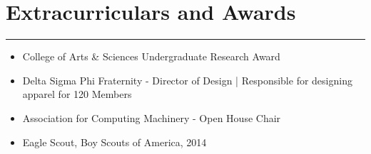 \documentclass[11pt]{article}
\newcommand{\resumesection}[1]{\vspace{-0.2cm}\section*{#1}\vspace{-0.2cm}\hrule\vspace{0.2cm}}
\begin{document}
\resumesection{Extracurriculars and Awards}
\begin{itemize}
	\item College of Arts \& Sciences Undergraduate Research Award
	\item Delta Sigma Phi Fraternity - Director of Design | Responsible for designing apparel for 120 Members
	\item Association for Computing Machinery - Open House Chair 
	\item Eagle Scout, Boy Scouts of America, 2014
\end{itemize}





\end{document}
